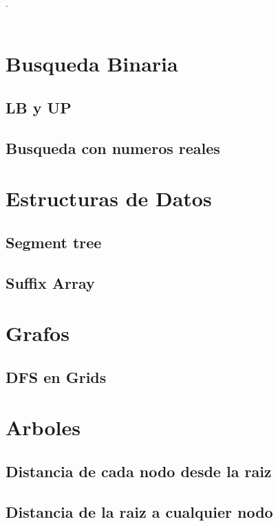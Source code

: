 

\def\title{Competitive Programing Reference}
.\\[0.2cm]
 \\[0.5cm]
\tableofcontents\newpage

\section{Busqueda Binaria}
	\subsection{LB y UP}
	\subsection{Busqueda con numeros reales}

\section{Estructuras de Datos}
	\subsection{Segment tree}
	\subsection{Suffix Array}

\section{Grafos}
	\subsection{DFS en Grids}

\section{Arboles}
	\subsection{Distancia de cada nodo desde la raiz}
	\subsection{Distancia de la raiz a cualquier nodo}
